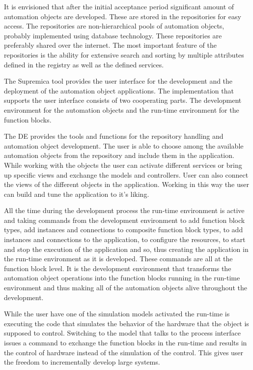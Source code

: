 It is envisioned that after the initial acceptance period
significant amount of automation objects are developed.
These are stored in the repositories for easy access. The
repositories are non-hierarchical pools of automation
objects, probably implemented using database technology.
These repositories are preferably shared over the internet.
The most important feature of the repositories is the
ability for extensive search and sorting by multiple
attributes defined in the registry as well as the defined
services.

The Supremica tool provides the user interface for the
development and the deployment of the automation object
applications. The implementation that supports the user
interface consists of two cooperating parts. The development
environment for the automation objects and the run-time
environment for the function blocks. 

The DE provides the tools and functions for the repository
handling and automation object development. The user is able
to choose among the available automation objects from the
repository and include them in the application. While
working with the objects the user can activate different
services or bring up specific views and exchange the models
and controllers. User can also connect the views of the
different objects in the application. Working in this way
the user can build and tune the application to it's liking.

All the time during the development process the run-time
environment is active and taking commands from the
development environment to add function block types, add
instances and connections to composite function block types,
to add instances and connections to the application, to
configure the resources, to start and stop the execution of
the application and so, thus creating the application in the
run-time environment as it is developed. These commands are
all at the function block level. It is the development
environment that transforms the automation object operations
into the function blocks running in the run-time environment
and thus making all of the automation objects alive
throughout the development.

While the user have one of the simulation models activated
the run-time is executing the code that simulates the
behavior of the hardware that the object is supposed to
control. Switching to the model that talks to the process
interface issues a command to exchange the function blocks
in the run-time and results in the control of hardware
instead of the simulation of the control. This gives user
the freedom to incrementally develop large systems. 

